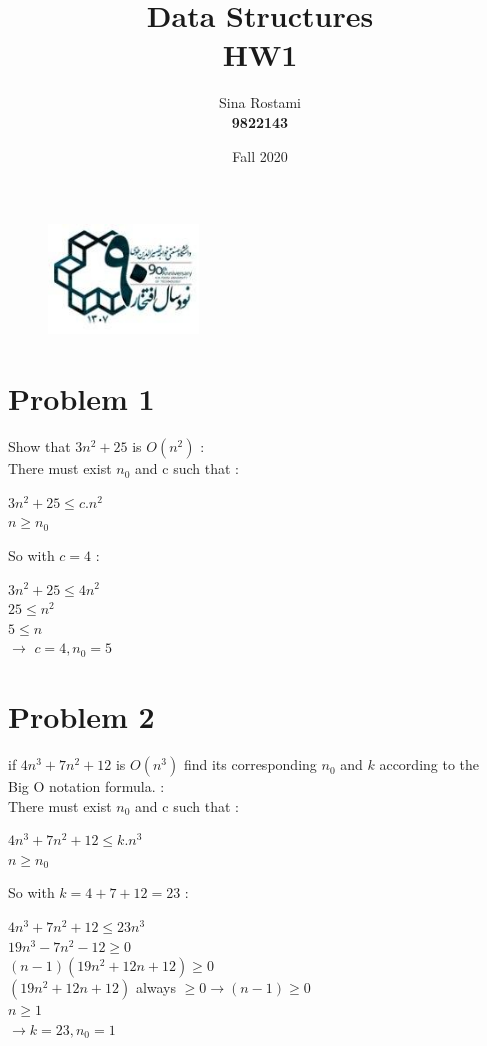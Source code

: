 \documentclass{report}
\title{\Huge Data Structures \\ HW1}
\author{\huge Sina Rostami \\\huge \textbf{9822143}}
\date{Fall 2020}
\newcommand\tab[1][1cm]{\hspace*{#1}}
\begin{document}
    \begin{figure}
        \includegraphics[height = 30mm,width = 40mm]{../kntu_logo.jpg}
    \end{figure}
    \maketitle
    \section*{\huge Problem 1}
        
        Show that $3n^2 + 25$ is $O(n^2)$ :\\
            \tab There must exist $n_0$ and c such that :
        \begin{center}
            \large $ 3n^2 + 25 \leq c.n^2$\\
            \large $n \geq n_0$
        \end{center}
        \tab So with $c = 4$ :
        \begin{center}
            $3n^2 + 25 \leq 4n^2$ \\
            $25 \leq n^2$ \\
            $5 \leq n$ \\
            \huge $\rightarrow$ $c = 4, n_0 = 5$ 
        \end{center}

    \section*{\huge Problem 2}
        if $4n^3 + 7n^2 + 12$ is $O(n^3)$ find its corresponding
        $n_0$ and $k$ according to the \\Big O notation formula. :\\
            \tab There must exist $n_0$ and c such that :
        \begin{center}
            \large $ 4n^3 + 7n^2 + 12 \leq k.n^3  $\\
            \large $n \geq n_0$
        \end{center}
        \tab So with $k = 4 + 7 + 12 = 23$ :
        \begin{center}
            $4n^3 + 7n^2 + 12 \leq 23n^3$ \\
            $ 19n^3 - 7n^2 - 12 \geq 0 $ \\
            $(n-1)(19n^2+12n+12) \geq 0$ \\
            $(19n^2+12n+12)$ always $\geq 0 \rightarrow (n-1) \geq 0$ \\
            $ n \geq 1$ \\
            \huge $\rightarrow k = 23, n_0 = 1$
        \end{center}
\end{document}
